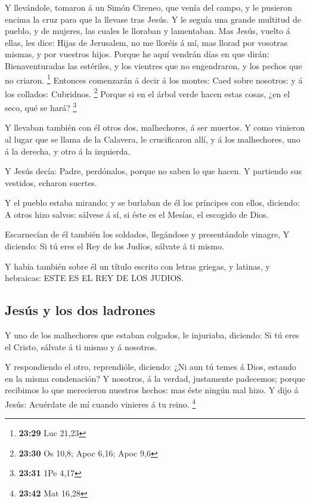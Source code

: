  Y llevándole, tomaron á un Simón Cireneo, que venía del
campo, y le pusieron encima la cruz para que la llevase tras Jesús.
 Y le seguía una grande multitud de pueblo, y de mujeres,
las cuales le lloraban y lamentaban.  Mas Jesús, vuelto á
ellas, les dice: Hijas de Jerusalem, no me lloréis á mí, mas llorad por
vosotras mismas, y por vuestros hijos.  Porque he aquí
vendrán días en que dirán: Bienaventuradas las estériles, y los vientres
que no engendraron, y los pechos que no criaron. \footnote{\textbf{23:29}
  Luc 21,23}  Entonces comenzarán á decir á los montes:
Caed sobre nosotros: y á los collados: Cubridnos. \footnote{\textbf{23:30}
  Os 10,8; Apoc 6,16; Apoc 9,6}  Porque si en el árbol
verde hacen estas cosas, ¿en el seco, qué se hará? \footnote{\textbf{23:31}
  1Pe 4,17}

 Y llevaban también con él otros dos, malhechores, á ser
muertos.  Y como vinieron al lugar que se llama de la
Calavera, le crucificaron allí, y á los malhechores, uno á la derecha, y
otro á la izquierda.

 Y Jesús decía: Padre, perdónalos, porque no saben lo que
hacen. Y partiendo sus vestidos, echaron suertes.

 Y el pueblo estaba mirando; y se burlaban de él los
príncipes con ellos, diciendo: A otros hizo salvos: sálvese á sí, si
éste es el Mesías, el escogido de Dios.

 Escarnecían de él también los soldados, llegándose y
presentándole vinagre,  Y diciendo: Si tú eres el Rey de
los Judíos, sálvate á ti mismo.

 Y había también sobre él un título escrito con letras
griegas, y latinas, y hebraicas: ESTE ES EL REY DE LOS JUDIOS.

\hypertarget{jesuxfas-y-los-dos-ladrones}{%
\subsection{Jesús y los dos
ladrones}\label{jesuxfas-y-los-dos-ladrones}}

 Y uno de los malhechores que estaban colgados, le
injuriaba, diciendo: Si tú eres el Cristo, sálvate á ti mismo y á
nosotros.

 Y respondiendo el otro, reprendióle, diciendo: ¿Ni aun
tú temes á Dios, estando en la misma condenación?  Y
nosotros, á la verdad, justamente padecemos; porque recibimos lo que
merecieron nuestros hechos: mas éste ningún mal hizo.  Y
dijo á Jesús: Acuérdate de mí cuando vinieres á tu reino. \footnote{\textbf{23:42}
  Mat 16,28}

